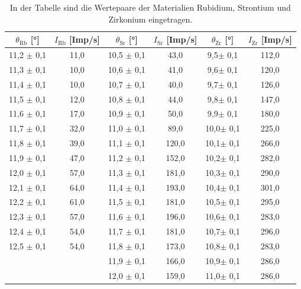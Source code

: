 \documentclass[titlepage = firstcover]{scrartcl}
\begin{document}
            \begin{table}
              \centering
              \caption{In der Tabelle sind die Wertepaare der Materialien Rubidium, Strontium und Zirkonium eingetragen.}

              \begin{tabular} {c c c c c c}
                \toprule
                {$\theta_{\text{Rb}}$ [°]} & {$I_{\text{Rb}}$ [Imp/s]} & {$\theta_{\text{Sr}}$ [°]} & {$I_{\text{Sr}}$ [Imp/s]} & {$\theta_{\text{Zr}}$ [°]} & {$I_{\text{Zr}}$ [Imp/s]} \\
                \midrule
                11,2 $\pm$ 0,1	& 11,0   & 10,5 $\pm$ 0,1  & 43,0   &  9,5$\pm$ 0,1 & 112,0 \\
                11,3 $\pm$ 0,1	& 10,0   & 10,6 $\pm$ 0,1  & 41,0   &  9,6$\pm$ 0,1 & 120,0 \\
                11,4 $\pm$ 0,1	& 10,0   & 10,7 $\pm$ 0,1  & 40,0   &  9,7$\pm$ 0,1 & 126,0 \\
                11,5 $\pm$ 0,1	& 12,0   & 10,8 $\pm$ 0,1  & 44,0   &  9,8$\pm$ 0,1 & 147,0 \\
                11,6 $\pm$ 0,1	& 17,0   & 10,9 $\pm$ 0,1  & 50,0   &  9,9$\pm$ 0,1 & 180,0 \\
                11,7 $\pm$ 0,1	& 32,0   & 11,0 $\pm$ 0,1  & 89,0   & 10,0$\pm$ 0,1 & 225,0 \\
                11,8 $\pm$ 0,1	& 39,0   & 11,1 $\pm$ 0,1  & 120,0  & 10,1$\pm$ 0,1 & 266,0 \\
                11,9 $\pm$ 0,1	& 47,0   & 11,2 $\pm$ 0,1  & 152,0  & 10,2$\pm$ 0,1 & 282,0 \\
                12,0 $\pm$ 0,1	& 57,0   & 11,3 $\pm$ 0,1  & 181,0  & 10,3$\pm$ 0,1 & 290,0 \\
                12,1 $\pm$ 0,1	& 64,0   & 11,4 $\pm$ 0,1  & 193,0  & 10,4$\pm$ 0,1 & 301,0 \\
                12,2 $\pm$ 0,1	& 61,0   & 11,5 $\pm$ 0,1  & 181,0  & 10,5$\pm$ 0,1 & 295,0 \\
                12,3 $\pm$ 0,1	& 57,0   & 11,6 $\pm$ 0,1  & 196,0  & 10,6$\pm$ 0,1 & 283,0 \\
                12,4 $\pm$ 0,1	& 54,0   & 11,7 $\pm$ 0,1  & 181,0  & 10,7$\pm$ 0,1 & 296,0 \\
                12,5 $\pm$ 0,1	& 54,0   & 11,8 $\pm$ 0,1  & 173,0  & 10,8$\pm$ 0,1 & 283,0 \\
                              	&        & 11,9 $\pm$ 0,1  & 166,0  & 10,9$\pm$ 0,1 & 286,0 \\
                              	&        & 12,0 $\pm$ 0,1  & 159,0  & 11,0$\pm$ 0,1 & 286,0 \\
                \bottomrule  
              \end{tabular}
            \end{table}
            \FloatBarrier
\end{document}
